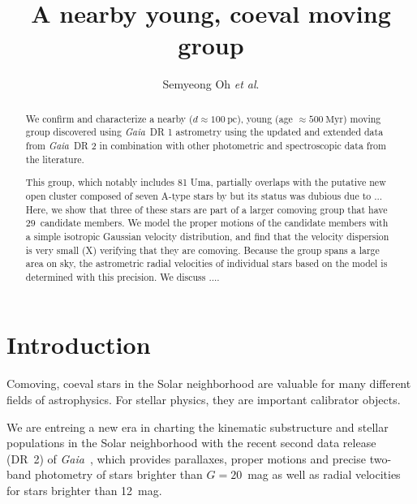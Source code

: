 \documentclass[modern,letterpaper]{aastex61}
\newcommand{\project}[1]{\textsl{#1}}
\newcommand{\gaia}{\project{Gaia}}
\newcommand{\etal}{\textit{et al}.}
\newcommand{\todo}[1]{{\color{crimson}#1}}
\newcommand{\groupDistanceEstimate}{\ensuremath{100~\mathrm{pc}}}
\newcommand{\groupAgeEstimate}{\ensuremath{500~\mathrm{Myr}}}
\newcommand{\totalNumberOfCandidates}{\ensuremath{29}}
\begin{document}
\sloppy\sloppypar\raggedbottom\frenchspacing %

\title{
  A nearby young, coeval moving group
}

\author[0000-0001-7790-5308]{Semyeong Oh \etal}


\begin{abstract}

  We confirm and characterize a nearby (\todo{$d \approx \groupDistanceEstimate$}),
  young (\todo{age $\approx \groupAgeEstimate$}) moving group discovered
  using \gaia\ DR 1 astrometry using the updated and extended data from \gaia\ DR 2
  in combination with other photometric and spectroscopic data from the literature.

  This group, which notably includes \todo{81 Uma},
  partially overlaps with the putative new open cluster composed of
  seven A-type stars by \citet{1977ATsir.969....7L} but its status
  was dubious due to ...
  Here, we show that three of these stars are part of a larger comoving group
  that have \totalNumberOfCandidates\ candidate members.
  We model the proper motions of the candidate members with a simple
  isotropic Gaussian velocity distribution, and find that
  the velocity dispersion is very small (\todo{X}) verifying
  that they are comoving.
  Because the group spans a large area on sky, the astrometric radial velocities
  of individual stars based on the model is determined with \todo{this precision}.
  We discuss ....

\end{abstract}

\section{Introduction} %
\label{sec:introduction}

Comoving, coeval stars in the Solar neighborhood are valuable for many different
fields of astrophysics.
For stellar physics, they are important calibrator objects.


We are entreing a new era in charting the kinematic substructure and stellar
populations in the Solar neighborhood with the recent second data release (DR~2)
of \gaia\ \citep{2018arXiv180409365G}, which provides parallaxes, proper motions
and precise two-band photometry of stars brighter than $G=20$~mag as well as
radial velocities for stars brighter than 12~mag.
\end{document}
